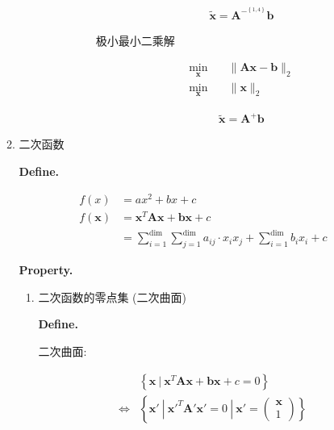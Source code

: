 \documentclass{article}
\begin{document}
\begin{enumerate}
\begin{enumerate}
\begin{enumerate}
\begin{itemize}
\begin{itemize}
\begin{itemize}
										\begin{align*}\tilde{\boldsymbol x} = \boldsymbol A^{-^{\left\{1,4\right\}}} \boldsymbol b\end{align*}

									极小最小二乘解\par
										\begin{align*}
\min_{\boldsymbol x} \quad& \| \boldsymbol A \boldsymbol x - \boldsymbol b\| _2\\
\min_{\boldsymbol x} \quad& \| \boldsymbol x\| _2
\end{align*}

										\begin{align*}\tilde{\boldsymbol x} = \boldsymbol A^+ \boldsymbol b\end{align*}

								\end{itemize}
							\end{itemize}
					\end{itemize}
				\end{enumerate}\par
		\item 二次函数\par
			\textbf{Define. }\par
				\begin{align*}
f\left(x\right) &= a x^2 + b x + c  \tag{一元二次}\\
f\left(\boldsymbol x\right) &= \boldsymbol x^T \boldsymbol A \boldsymbol x + \boldsymbol b \boldsymbol x + c  \tag{多元二次, 矢量式}\\
 &= \sum\limits_{i=1}^{\dim} \sum\limits_{j=1}^{\dim} a_{ij} · x_i x_j + \sum\limits_{i=1}^{\dim} b_i x_i + c  \tag{分量式}
\end{align*}

			\textbf{Property. }\par
				\begin{enumerate}\par
				\item 二次函数的零点集 (二次曲面)\par
					\textbf{Define. }\par
						二次曲面:\par
						\begin{align*}
&\left\{ \boldsymbol x \ |\ \boldsymbol x^T \boldsymbol A \boldsymbol x + \boldsymbol b \boldsymbol x + c = 0\right\}\\
\Leftrightarrow &\left\{ \boldsymbol x' \ |\ \boldsymbol x'^T \boldsymbol A' \boldsymbol x' = 0 \ |\  \boldsymbol x' = \left(\begin{matrix} \boldsymbol x \\ 1 \end{matrix}\right)\right\}
\end{align*}


\end{enumerate}
\end{enumerate}
\end{enumerate}
\end{document}
